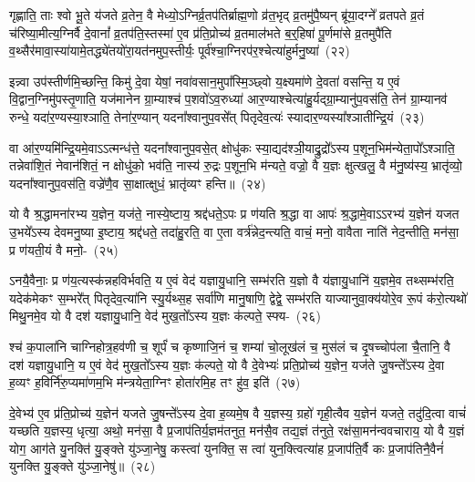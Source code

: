 गृह्णाति॒ ताः श्वो भू॒ते य॑जते व्र॒तेन॒ वै मेध्यो॒\-ऽग्निर्व्र॒तप॑तिर्ब्राह्म॒णो व्र॑त॒भृद् व्र॒तमु॑पै॒ष्यन् ब्रू॑या॒दग्ने᳚ व्रतपते व्र॒तं च॑रिष्या॒मीत्य॒ग्निर्वै दे॒वानां᳚ व्र॒तप॑ति॒स्तस्मा॑ ए॒व प्र॑ति॒प्रोच्य॑ व्र॒तमाल॑भते ब॒र्॒\mbox{}हिषा॑ पू॒र्णमा॑से व्र॒तमुपै॑ति व॒थ्सैर॑मा\-वा॒स्या॑यामे॒तद्ध्ये॑तयो॑\-रा॒यत॑न\-मुप॒स्तीर्यः॒ पूर्व॑श्चा॒ग्निरप॑र॒\-श्चेत्या॑हुर्मनु॒ष्या॑~(२२)\ip

इन्न्वा उप॑स्तीर्णमि॒च्छन्ति॒ किमु॑ दे॒वा येषां॒ नवा॑वसान॒\-मुपा᳚स्मि॒ञ्छ्वो य॒क्ष्यमा॑णे दे॒वता॑ वसन्ति॒ य ए॒वं वि॒द्वान॒ग्निमु॑पस्तृ॒णाति॒ यज॑मानेन ग्रा॒म्याश्च॑ प॒शवो॑\-ऽव॒रुध्या॑ आर॒ण्याश्चेत्या॑\-हु॒र्यद्ग्रा॒म्यानु॑प॒\-वस॑ति॒ तेन॑ ग्रा॒म्यानव॑ रुन्धे॒ यदा॑र॒ण्यस्या॒श्ञाति॒ तेना॑र॒ण्यान् यदना᳚श्वानुप॒वसे᳚त् पितृदेव॒त्यः॑ स्यादा\-र॒ण्यस्या᳚श्ञातीन्द्रि॒यं~(२३)\ip

वा आ॑र॒ण्यमि॑न्द्रि॒यमे॒वा\-ऽऽ\-त्मन्ध॑त्ते॒ यदना᳚श्वानुप॒वसे॒त् क्षोधु॑कः स्या॒द्यद॑श्ञी॒याद्रु॒द्रो᳚\-ऽस्य प॒शून॒भिम॑न्येता॒पो᳚\-ऽश्ञाति॒ तन्नेवा॑शि॒तं नेवान॑शितं॒ न क्षोधु॑को॒ भव॑ति॒ नास्य॑ रु॒द्रः प॒शून॒भि म॑न्यते॒ वज्रो॒ वै य॒ज्ञः क्षुत्खलु॒ वै म॑नु॒ष्य॑स्य॒ भ्रातृ॑व्यो॒ यदना᳚श्वानुप॒वस॑ति॒ वज्रे॑णै॒व सा॒क्षात्क्षुधं॒ भ्रातृ॑व्यꣳ हन्ति॥~(२४)\ip

{\anuvakamend[{परि॑ मनु॒ष्या॑ इन्द्रि॒यꣳ सा॒क्षात् त्रीणि॑ च}]}

यो वै श्र॒द्धामना॑रभ्य य॒ज्ञेन॒ यज॑ते॒ नास्ये॒ष्टाय॒ श्रद्द॑धते॒\-ऽपः प्र ण॑यति श्र॒द्धा वा आपः॑ श्र॒द्धामे॒वा\-ऽऽ\-रभ्य॑ य॒ज्ञेन॑ यजत उ॒भये᳚\-ऽस्य देवमनु॒ष्या इ॒ष्टाय॒ श्रद्द॑धते॒ तदा॑हु॒रति॒ वा ए॒ता वर्त्र॑न्नेद॒न्त्यति॒ वाचं॒ मनो॒ वावैता नाति॑ नेद॒न्तीति॒ मन॑सा॒ प्र ण॑यती॒यं वै मनो॒-~(२५)\ip

ऽनयै॒वैनाः॒ प्र ण॑य॒त्यस्क॑न्नहविर्भवति॒ य ए॒वं वेद॑ यज्ञायु॒धानि॒ सम्भ॑रति य॒ज्ञो वै य॑ज्ञायु॒धानि॑ य॒ज्ञमे॒व तथ्सम्भ॑रति॒ यदेक॑मेकꣳ स॒म्भरे᳚त् पितृदेव॒त्या॑नि स्यु॒र्यथ्स॒ह सर्वा॑णि मानु॒षाणि॒ द्वेद्वे॒ सम्भ॑रति याज्यानुवा॒क्य॑योरे॒व रू॒पं क॑रो॒त्यथो॑ मिथु॒नमे॒व यो वै दश॑ यज्ञायु॒धानि॒ वेद॑ मुख॒तो᳚\-ऽस्य य॒ज्ञः क॑ल्पते॒ स्फ्य-~(२६)\ip

श्च॑ क॒पाला॑नि चाग्निहोत्र॒हव॑णी च॒ शूर्पं॑ च कृष्णाजि॒नं च॒ शम्या॑ चो॒लूख॑लं च॒ मुस॑लं च दृ॒षच्चोप॑ला चै॒तानि॒ वै दश॑ यज्ञायु॒धानि॒ य ए॒वं वेद॑ मुख॒तो᳚\-ऽस्य य॒ज्ञः क॑ल्पते॒ यो वै दे॒वेभ्यः॑ प्रति॒प्रोच्य॑ य॒ज्ञेन॒ यज॑ते जु॒षन्ते᳚\-ऽस्य दे॒वा ह॒व्यꣳ ह॒विर्नि॑रु॒प्यमा॑णम॒भि म॑न्त्रयेता॒ग्निꣳ होता॑रमि॒ह तꣳ हु॑व॒ इति॑~(२७)\ip

दे॒वेभ्य॑ ए॒व प्र॑ति॒प्रोच्य॑ य॒ज्ञेन॑ यजते जु॒षन्ते᳚\-ऽस्य दे॒वा ह॒व्यमे॒ष वै य॒ज्ञस्य॒ ग्रहो॑ गृही॒त्वैव य॒ज्ञेन॑ यजते॒ तदु॑दि॒त्वा वाचं॑ यच्छति य॒ज्ञस्य॒ धृत्या॒ अथो॒ मन॑सा॒ वै प्र॒जा\-प॑तिर्य॒ज्ञम॑तनुत॒ मन॑सै॒व तद्य॒ज्ञं त॑नुते॒ रक्ष॑सा॒मन॑न्ववचाराय॒ यो वै य॒ज्ञं योग॒ आग॑ते यु॒नक्ति॑ यु॒ङ्क्ते यु॑ञ्जा॒नेषु॒ कस्त्वा॑ युनक्ति॒ स त्वा॑ युन॒क्त्वित्या॑ह प्र॒जा\-प॑ति॒र्वै कः प्र॒जा\-प॑तिनै॒वैनं॑ युनक्ति यु॒ङ्क्ते यु॑ञ्जा॒नेषु॑॥~(२८)\ip

